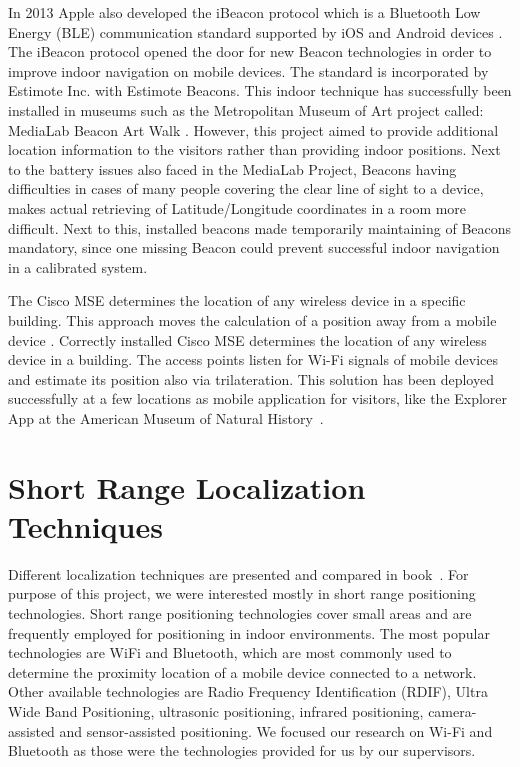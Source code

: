 In 2013 Apple also developed the iBeacon protocol which is a Bluetooth Low Energy (BLE) communication standard supported by iOS and Android devices \cite{iBeacon}. The iBeacon protocol opened the door for new Beacon technologies in order to improve indoor navigation on mobile devices. The standard is incorporated by Estimote Inc. with Estimote Beacons. This indoor technique has successfully been installed in museums such as the Metropolitan Museum of Art project called: MediaLab Beacon Art Walk \cite{MOArt15}. However, this project aimed to provide additional location information to the visitors rather than providing indoor positions. Next to the battery issues also faced in the MediaLab Project, Beacons having difficulties  in cases of many people covering the clear line of sight to a device, makes actual retrieving of Latitude/Longitude coordinates in a room more difficult. Next to this, installed beacons made  temporarily maintaining of Beacons mandatory, since one missing Beacon could prevent successful indoor navigation in a calibrated system.

The Cisco MSE determines the location of any wireless device in a specific building. This approach moves the calculation of a position away from a mobile device \cite{oreilly11}. Correctly installed Cisco MSE determines the location of any wireless device in a building. The access points listen for Wi-Fi signals of mobile devices and estimate its position also via trilateration. This solution has been deployed successfully at a few locations as mobile application for visitors, like the Explorer App  at the American Museum of Natural History\ \cite{AMNH15}.


\vspace{0.5cm}

\section{Short Range Localization Techniques}
\label{short_range_localization_techniques}
Different localization techniques are presented and compared in book~\cite{brimicombe2009location}. For purpose of this project, we were interested mostly in short range positioning technologies. Short range positioning technologies cover small areas and are frequently employed for positioning in indoor environments. The most popular technologies are WiFi and Bluetooth, which are most commonly used to determine the proximity location of a mobile device connected to a network. Other available technologies are Radio Frequency Identification (RDIF), Ultra Wide Band Positioning, ultrasonic positioning, infrared positioning, camera-assisted and sensor-assisted positioning. We focused our research on Wi-Fi and Bluetooth as those were the technologies provided for us by our supervisors.

